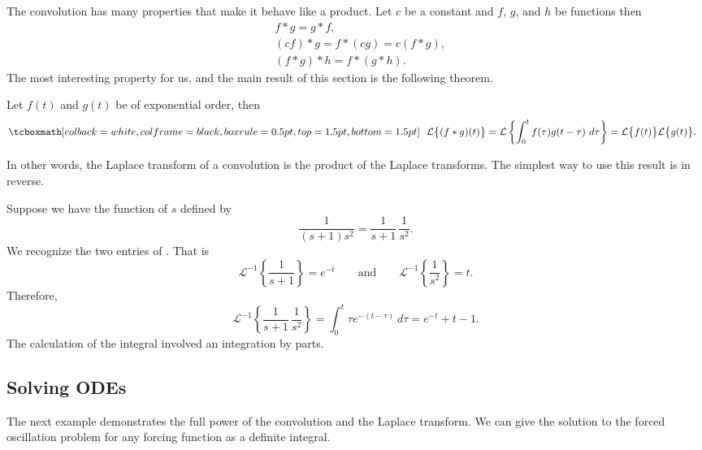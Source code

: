 The convolution has many properties that make it behave like a product.
Let $c$ be a constant and $f$, $g$, and $h$ be functions then
\begin{align*}
& f * g = g * f , \\
& (c f) * g = f * (c g) = c (f*g) , \\
& ( f * g ) * h = f * ( g * h ) .
\end{align*}
The most interesting property for us, and
the main result of this section is the following theorem.

\begin{theorem}
Let $f(t)$ and $g(t)$ be of exponential order, then
\begin{equation*}
\mybxbg{~~
\mathcal{L} \bigl\{ (f*g)(t) \bigr\}
=
\mathcal{L} \left\{ \int_0^t f(\tau) g(t-\tau) ~ d\tau \right\}
=
\mathcal{L} \bigl\{ f(t) \bigr\} \mathcal{L} \bigl\{ g(t) \bigr\} .
~~}
\end{equation*}
\end{theorem}

In other words, the Laplace transform of a convolution is the product
of the Laplace transforms.  The simplest way to use this result is in
reverse.

\begin{example}
Suppose we have the function of $s$
defined by
\begin{equation*}
\frac{1}{(s+1)s^2} = 
\frac{1}{s+1}\,
\frac{1}{s^2} .
\end{equation*}
We recognize the two entries of .  That is
\begin{equation*}
\mathcal{L}^{-1} 
\left\{
\frac{1}{s+1} \right\}
= e^{-t}
\qquad \text{and} \qquad
\mathcal{L}^{-1} 
\left\{
\frac{1}{s^2} \right\} 
= t.
\end{equation*}
Therefore,
\begin{equation*}
\mathcal{L}^{-1}
\left\{
\frac{1}{s+1}\,
\frac{1}{s^2} \right\}
=
\int_0^t
\tau e^{-(t-\tau)} ~d\tau
=
e^{-t}+t-1 .
\end{equation*}
The calculation of the integral involved an integration by parts.
\end{example}

\subsection{Solving ODEs}

The next example demonstrates the full power of the convolution and
the Laplace transform.  We can give the solution to
the forced oscillation problem for any forcing function as a definite
integral.

